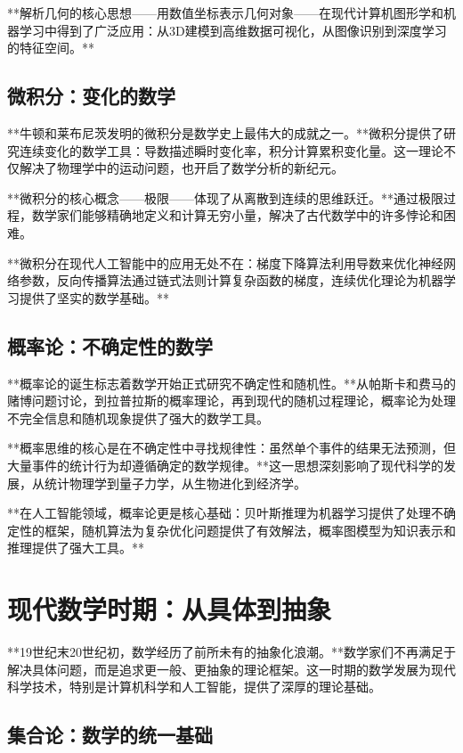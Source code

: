 **解析几何的核心思想——用数值坐标表示几何对象——在现代计算机图形学和机器学习中得到了广泛应用：从3D建模到高维数据可视化，从图像识别到深度学习的特征空间。**

\subsection{微积分：变化的数学}

**牛顿和莱布尼茨发明的微积分是数学史上最伟大的成就之一。**微积分提供了研究连续变化的数学工具：导数描述瞬时变化率，积分计算累积变化量。这一理论不仅解决了物理学中的运动问题，也开启了数学分析的新纪元。

**微积分的核心概念——极限——体现了从离散到连续的思维跃迁。**通过极限过程，数学家们能够精确地定义和计算无穷小量，解决了古代数学中的许多悖论和困难。

**微积分在现代人工智能中的应用无处不在：梯度下降算法利用导数来优化神经网络参数，反向传播算法通过链式法则计算复杂函数的梯度，连续优化理论为机器学习提供了坚实的数学基础。**

\subsection{概率论：不确定性的数学}

**概率论的诞生标志着数学开始正式研究不确定性和随机性。**从帕斯卡和费马的赌博问题讨论，到拉普拉斯的概率理论，再到现代的随机过程理论，概率论为处理不完全信息和随机现象提供了强大的数学工具。

**概率思维的核心是在不确定性中寻找规律性：虽然单个事件的结果无法预测，但大量事件的统计行为却遵循确定的数学规律。**这一思想深刻影响了现代科学的发展，从统计物理学到量子力学，从生物进化到经济学。

**在人工智能领域，概率论更是核心基础：贝叶斯推理为机器学习提供了处理不确定性的框架，随机算法为复杂优化问题提供了有效解法，概率图模型为知识表示和推理提供了强大工具。**

\section{现代数学时期：从具体到抽象}

**19世纪末20世纪初，数学经历了前所未有的抽象化浪潮。**数学家们不再满足于解决具体问题，而是追求更一般、更抽象的理论框架。这一时期的数学发展为现代科学技术，特别是计算机科学和人工智能，提供了深厚的理论基础。

\subsection{集合论：数学的统一基础}

